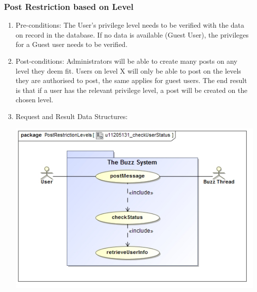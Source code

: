 \documentclass[hidelinks, 12pt, oneside]{article}
\begin{document}
\subsubsection{Post Restriction based on Level}
\begin{enumerate}
	\item Pre-conditions: The User's privilege level needs to be verified with the data on record in the database. If no data is available (Guest User), the privileges for a Guest user needs to be verified.
 
	\item Post-conditions: Administrators will be able to create many posts on any level they deem fit. Users on level X will only be able to post on the levels they are authorised to post, the same applies for guest users. The end result is that if a user has the relevant privilege level, a post will be created on the chosen level.
 
	\item Request and Result Data Structures:\\
	\centerline{\includegraphics[scale=0.7]{u11205131_checkUserStatus}}
\end{enumerate}
\end{document}
